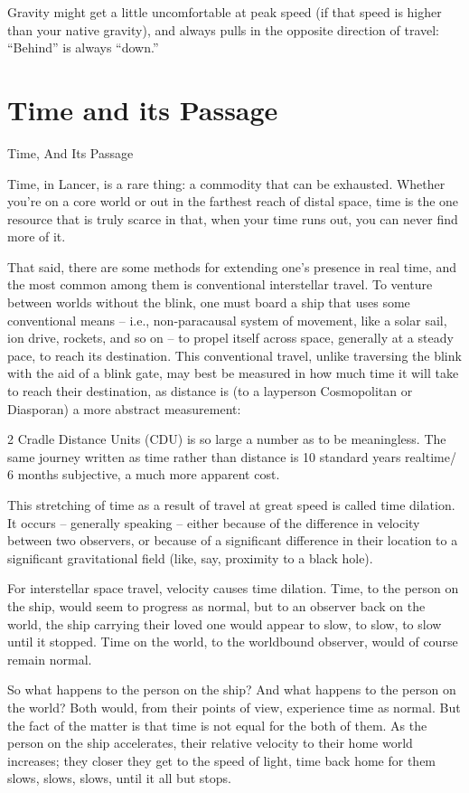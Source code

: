 Gravity might get a little uncomfortable at peak speed (if that speed is higher than your  
native gravity), and always pulls in the opposite direction of travel: “Behind” is always  
“down.” 
 
\section{Time and its Passage}
Time, And Its Passage  

Time, in Lancer, is a rare thing: a commodity that can be exhausted. Whether you’re on a core  
world or out in the farthest reach of distal space, time is the one resource that is truly scarce in  
that, when your time runs out, you can never find more of it.  

That said, there are some methods for extending one’s presence in real time, and the most  
common among them is conventional interstellar travel. To venture between worlds without the  
blink, one must board a ship that uses some conventional means  -- i.e., non-paracausal system  
of movement, like a solar sail, ion drive, rockets, and so on -- to propel itself across space,  
generally at a steady pace, to reach its destination. This conventional travel, unlike traversing the  
blink with the aid of a blink gate, may best be measured in how much time it will take to reach  
their destination, as distance is (to a layperson Cosmopolitan or Diasporan) a more abstract  
measurement:  

2 Cradle Distance Units (CDU) is so large a number as to be meaningless. The same journey  
written as time rather than distance is 10 standard years realtime/ 6 months subjective, a much  
more apparent cost.   

This stretching of time as a result of travel at great speed is called time dilation. It occurs --  
generally speaking -- either because of the difference in velocity between two observers, or  
because of a significant difference in their location to a significant gravitational field (like,  
say, proximity to a black hole).  

For interstellar space travel, velocity causes time dilation. Time, to the person on the ship,  
would seem to progress as normal, but to an observer back on the world, the ship carrying  
their loved one would appear to slow, to slow, to slow until it stopped. Time on the world, to  
the worldbound observer, would of course remain normal.   

So what happens to the person on the ship? And what happens to the person on the world?  
Both would, from their points of view, experience time as normal. But the fact of the matter  
is that time is not equal for the both of them. As the person on the ship accelerates, their  
relative velocity to their home world increases; they closer they get to the speed of light,  
time back home for them slows, slows, slows, until it all but stops.   

